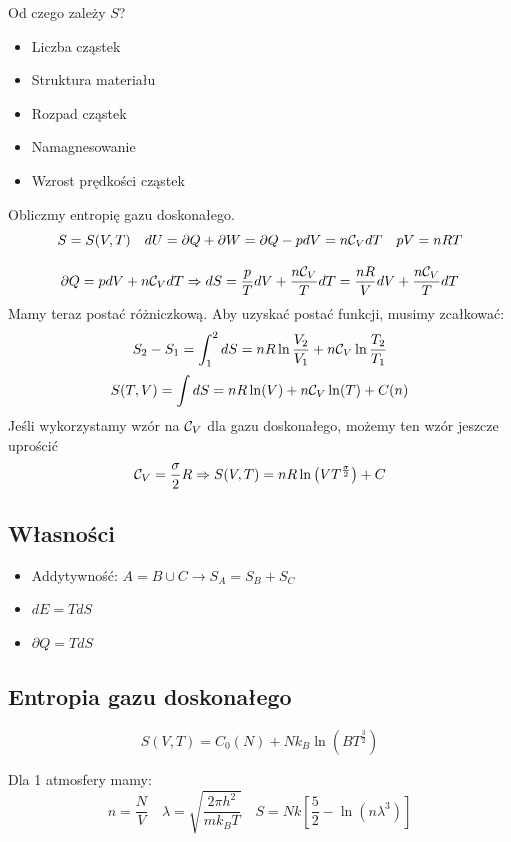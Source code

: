 \documentclass{../notatki}
\begin{document}
Od czego zależy $S$?
\begin{itemize}
  \item Liczba cząstek
  \item Struktura materiału
  \item Rozpad cząstek
  \item Namagnesowanie
  \item Wzrost prędkości cząstek
\end{itemize}

\begin{examplebox}
  Obliczmy entropię gazu doskonałego.
  $$
  S = S(V, T) \quad dU = \partial Q + \partial W = \partial Q - pdV =
  n\mathcal{C}_V dT \quad pV = nRT
  $$

  \vspace{1em}
  $$
  \partial Q = pdV + n\mathcal{C}_V dT \Rightarrow dS = \frac{p}{T} dV +
  \frac{n\mathcal{C}_V}{T} dT = \frac{nR}{V} dV + \frac{n\mathcal{C}_V}{T} dT
  $$
  Mamy teraz postać różniczkową. Aby uzyskać postać funkcji, musimy zcałkować:
  $$
  S_2 - S_1 = \int_1^2 dS = nR\ln\frac{V_2}{V_1} + n\mathcal{C}_V \ln\frac{T_2}{T_1}
  $$
  $$
  S(T, V) = \int dS = nR\ln(V) + n\mathcal{C}_V\ln(T) + C(n)
  $$
  Jeśli wykorzystamy wzór na $\mathcal{C}_V$ dla gazu doskonałego, możemy ten
  wzór jeszcze uprościć
  $$
  \mathcal{C}_V = \frac{\sigma}{2}R \Rightarrow S(V, T) =
  nR\ln\left(VT^{\frac{\sigma}{2}}\right) + C
  $$
\end{examplebox}

\subsection{Własności}

\begin{itemize}
  \item Addytywność: $A = B \cup C \rightarrow S_A = S_B + S_C$
  \item $dE = TdS$
  \item $\partial Q = TdS$
\end{itemize}

\subsection{Entropia gazu doskonałego}

$$
S(V, T) = C_0(N) + Nk_B \ln (BT^{\frac{3}{2}})
$$

Dla 1 atmosfery mamy:
$$
n = \frac{N}{V} \quad \lambda = \sqrt{\frac{2\pi h^2}{mk_BT}} \quad S
= Nk \left[\frac{5}{2} - \ln \left(n \lambda^3\right)\right]
$$
\end{document}
